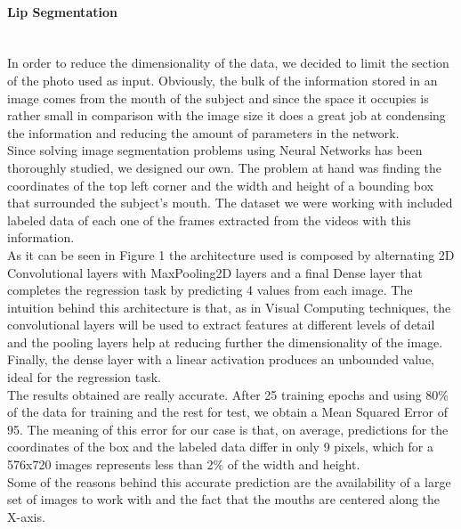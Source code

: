 \documentclass{article}[10pt]
\begin{document}
\begin{multicols}{2}
\paragraph{Lip Segmentation} ~\\

In order to reduce the dimensionality of the data, we decided to limit the
section of the photo used as input. Obviously, the bulk of the
information stored in an image comes from the mouth of the subject and since the
space it occupies is rather small in comparison with the image size it does a
great job at condensing the information and reducing the amount of parameters in
the network.\\

Since solving image segmentation problems using Neural Networks has been
thoroughly studied, we designed our own. The problem at hand was finding the
coordinates of the top left corner and the width and height of a bounding box
that surrounded the subject's mouth. The dataset we were working with included
labeled data of each one of the frames extracted from the videos with this
information. \\

As it can be seen in Figure 1 the architecture used is composed by alternating
2D Convolutional layers with MaxPooling2D layers and a final Dense layer that
completes the regression task by predicting 4 values from each image. The
intuition behind this architecture is that, as in Visual Computing techniques,
the convolutional layers will be used to extract features at different levels of
detail and the pooling layers help at reducing further the dimensionality of the
image. Finally, the dense layer with a linear activation produces an unbounded
value, ideal for the regression task.\\


The results obtained are really accurate. After 25 training epochs and using 80\%
of the data for training and the rest for test, we obtain a Mean Squared Error of
95. The meaning of this error for our case is that, on average, predictions
for the coordinates of the box and the labeled data differ in only 9 pixels, which
for a 576x720 images represents less than 2\% of the width and height.\\


Some of the reasons behind this accurate prediction are the availability of a
large set of images to work with and the fact that the mouths are centered along
the X-axis.


\end{multicols}
\end{document}
